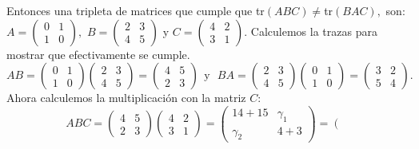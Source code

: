 \documentclass[11pt,letterpaper]{article}
\begin{document}
\begin{enumerate}
Entonces una tripleta de matrices que cumple que tr$(ABC)\neq$tr$(BAC),$ son: $A=\left( \begin{array}{cc}
0&1 \\
1&0
\end{array} \right),$ $B=\left( \begin{array}{cc}
2&3 \\
4&5
\end{array} \right)$ y $C=\left( \begin{array}{cc}
4&2 \\
3&1
\end{array} \right).$ Calculemos la trazas para mostrar que efectivamente se cumple. 
\begin{equation*}
AB=\left( \begin{array}{cc}
0&1 \\
1&0
\end{array} \right)\left( \begin{array}{cc}
2 & 3\\
4 & 5
\end{array} \right)=\left( \begin{array}{cc}
4 & 5\\
2 & 3
\end{array} \right)\ \  \text{y} \ \ \ BA=\left( \begin{array}{cc}
2 & 3\\
4 & 5
\end{array} \right)\left( \begin{array}{cc}
0&1 \\
1&0
\end{array} \right)=\left( \begin{array}{cc}
3 & 2\\
5 & 4
\end{array} \right).
\end{equation*}
Ahora calculemos la multiplicación con la matriz $C$:
\begin{equation*}
ABC=\left( \begin{array}{cc}
4 & 5\\
2 & 3
\end{array} \right)\left( \begin{array}{cc}
4 & 2\\
3 & 1
\end{array} \right)=
\left( \begin{array}{cc}
14+15 & \gamma_1\\
\gamma_2&4+3
\end{array} \right)=
\left( \begin{array}{cc}

\end{array}
\end{equation*}
\end{enumerate}
\end{document}
